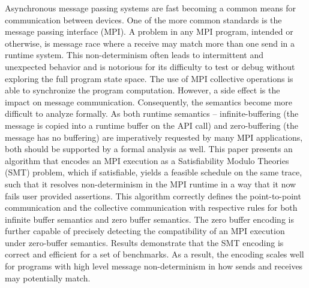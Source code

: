 Asynchronous message passing systems are fast becoming a common means for communication between devices.
%
One of the more common standards is the message passing interface (MPI).
%
A problem in any MPI program, intended or otherwise, is message race where a receive may match more than one send in a runtime system.
%
This non-determinism often leads to intermittent and unexpected behavior and is notorious for its difficulty to test or debug without exploring the full program state space. 
%
The use of MPI collective operations is able to synchronize the program computation. 
%
However, a side effect is the impact on message communication.
%
Consequently, the semantics become more difficult to analyze formally. 
%
As both runtime semantics -- infinite-buffering (the message is copied into a runtime buffer on the API call) and zero-buffering (the message has no buffering) are imperatively requested by many MPI applications, both should be supported by a formal analysis as well. 
%
This paper presents an algorithm that encodes an MPI execution as a Satisfiability Modulo Theories (SMT) problem, which if satisfiable, yields a feasible schedule on the same trace, such that it resolves non-determinism in the MPI runtime in a way that it now fails user provided assertions.
%
This algorithm correctly defines the point-to-point communication and the collective communication with respective rules for both infinite buffer semantics and zero buffer semantics. 
%
The zero buffer encoding is further capable of precisely detecting the compatibility of an MPI execution under zero-buffer semantics.
%
Results demonstrate that the SMT encoding is correct and efficient for a set of benchmarks. 
%
As a result, the encoding scales well for programs with high level message non-determinism in how sends and receives may potentially match.